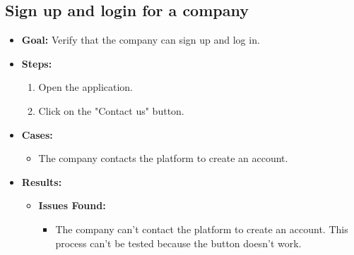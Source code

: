 \subsection{Sign up and login for a company}
\begin{itemize}
    \item \textbf{Goal:} Verify that the company can sign up and log in.

    \item \textbf{Steps:}
    \begin{enumerate}
        \item Open the application.
        \item Click on the "Contact us" button.
    \end{enumerate}
    \item \textbf{Cases:}
    \begin{itemize}
        \item The company contacts the platform to create an account.
    \end{itemize}
    \item \textbf{Results:}
    \begin{itemize}
        \item \textbf{Issues Found:}
        \begin{itemize}
            \item The company can't contact the platform to create an account. This process can't be tested because the button doesn't work.
        \end{itemize}
    \end{itemize}
\end{itemize}


